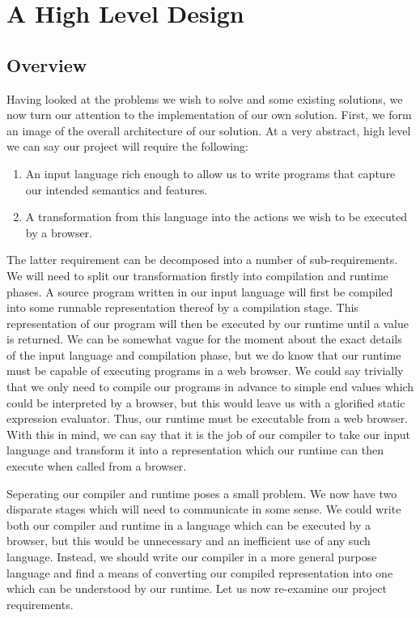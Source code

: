 
\section{A High Level Design}
\subsection{Overview}
Having looked at the problems we wish to solve and some existing solutions, we 
now turn our attention to the implementation of our own solution. First,
we form an image of the overall architecture of our solution. At a
very abstract, high level we can say our project will require the following:

\begin{enumerate}
	\item An input language rich enough to allow us to write programs
		  that capture our intended semantics and features.
	\item A transformation from this language into the actions we 
	 	  wish to be executed by a browser.
\end{enumerate}

\noindent The latter requirement can be decomposed into a number of sub-requirements.
We will need to split our transformation firstly into compilation and runtime phases.
A source program written in our input language will first be compiled into some runnable
representation thereof by a compilation stage. This representation of our program will
then be executed by our runtime until a value is returned. We can be somewhat vague
for the moment about the exact details of the input language and compilation phase, 
but we do know that our runtime must be capable of executing programs in a web browser.
We could say trivially that we only need to compile our programs in advance to simple
end values which could be interpreted by a browser, but this would leave us with a 
glorified static expression evaluator. Thus, our runtime must be executable from a
web browser. With this in mind, we can say that it is the job of our compiler to
take our input language and transform it into a representation which our runtime can
then execute when called from a browser. 

Seperating our compiler and runtime poses a small problem. We now have two disparate
stages which will need to communicate in some sense. We could write both our compiler
and runtime in a language which can be executed by a browser, but this would be 
unnecessary and an inefficient use of any such language. Instead, we should write our
compiler in a more general purpose language and find a means of converting our compiled
representation into one which can be understood by our runtime. Let us now re-examine
our project requirements.


